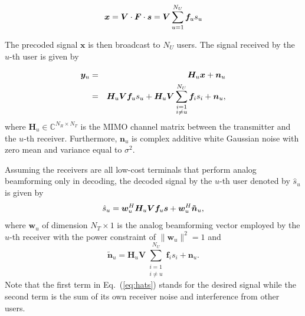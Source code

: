 \documentclass[10pt,journal,twocolumn,twoside]{IEEEtran}
\begin{document}
\begin{equation}{\label{eq:transx1}}
{\bm x} = \bm{V}\cdot \bm{F}\cdot\bm{s}= \bm{V}\sum_{u=1}^{N_U}\bm{f}_us_u
\end{equation}

The precoded signal $\bm x$ is then broadcast to $N_U$ users. The signal received by the $u$-th user is given by

\begin{eqnarray}{\label{eq:transx2}}
{\bm y}_u &=& \bm{H}_u \bm{x} + \bm{n}_u\\
&=&\bm{H}_u \bm{V}\bm{f}_us_u+\bm{H}_u \bm{V}\sum_{\substack{i=1 \\ i\neq u}}^{N_U}\bm{f}_is_i+\bm{n}_u,
\end{eqnarray}
where $\bm{H}_u$$\in\mathbb{C}^{N_R\times N_T}$ is the MIMO channel matrix between the transmitter and the $u$-th receiver\cite{el2014spatially}. Furthermore, $\bm{n}_u$ is complex additive white Gaussian noise with zero mean and variance equal to $\sigma^2$.

Assuming the receivers are all low-cost terminals that perform analog beamforming only in decoding, the decoded signal by the $u$-th user denoted by $\hat{s}_u$ is given by
\begin{equation}{\label{eq:hats}}
\hat{s}_u = \bm{w}_u^H \bm{H}_u \bm{V} \bm{f}_{u} \bm{s} + \bm{w}_u^H \bm{\tilde{n}}_u,
\end{equation}
where ${\bm w}_u$ of dimension $N_T\times 1$ is the analog beamforming vector employed by the $u$-th receiver with the power constraint of $\|\bm{w}_u\|^2=1$ and
\begin{equation}
\bm{\tilde{n}}_u=\bm{H}_u \bm{V}\sum_{\substack{i=1 \\ i\neq u}}^{N_U}\bm{f}_is_i+\bm{n}_u.
\end{equation}
Note that the first term in Eq.~(\ref{eq:hats}) stands for the desired signal while the second term is the sum of its own receiver noise and interference from other users.
\end{document}
